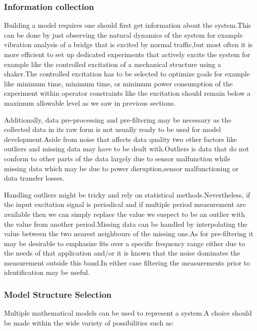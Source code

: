 \documentclass[a4paper,12pt]{article}
\numberwithin{equation}{section}
\begin{document}
\subsubsection{Information collection}
Building a model requires one should first get information about the system.This can be done by just observing the natural dynamics of the system for example vibration analysis of a bridge that is excited by normal traffic,but most often it is more efficient to set up dedicated experiments that actively excite the system for example like the controlled excitation of a mechanical structure using a shaker.The controlled excitation has to be selected to optimize  goals  for example like minimum time, minimum time, or minimum power consumption of the experiment within operator constraints like the excitation should remain below a maximum allowable level as we saw in previous sections.

Additionally, data pre-processing and pre-filtering  may be necessary as the collected data in its raw form is not usually ready to be used for model development.Aside from noise that affects data quality two other factors like outliers and missing data may have to be dealt with.Outliers is data that do not conform to other parts of the data largely due to sensor malfunction while  missing data which may be due to power disruption,sensor malfunctioning or data transfer losses. 

Handling outliers might be tricky and rely on statistical methods.Nevertheless, if the input excitation signal is periodical and if multiple period measurement are available then we can simply replace the value we suspect to be an outlier with the value from another period.Missing data can be handled by interpolating the value between the two nearest neighbours of the missing one.As for pre-filtering it may be desirable to emphasize fits over a specific frequency range either due to the needs of that application and/or it is known that the noise dominates the measurement outside this band.In either case  filtering the measurements prior to identification may be useful.

\subsubsection{Model Structure Selection}
Multiple mathematical models can be used to represent a system.A choice should be made within the wide variety of possibilities such as:
\end{document}
